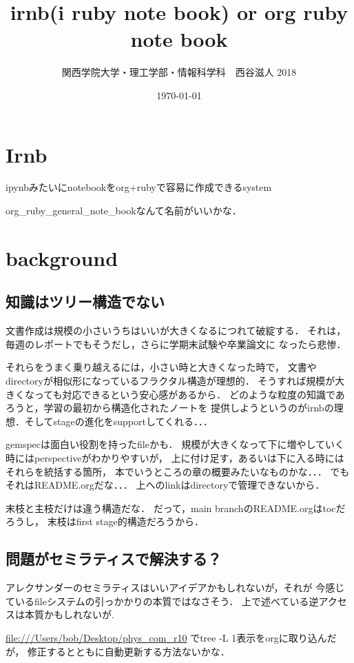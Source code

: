 \documentclass{jsarticle}
\author{関西学院大学・理工学部・情報科学科　西谷滋人 2018}
\date{\today}
\title{irnb(i ruby note book) or org ruby note book}
\begin{document}
\maketitle
\tableofcontents


\section{Irnb}
\label{sec-1}
ipynbみたいにnotebookをorg+rubyで容易に作成できるsystem

org\_ruby\_general\_note\_bookなんて名前がいいかな．

\section{background}
\label{sec-2}
\subsection{知識はツリー構造でない}
\label{sec-2-1}
文書作成は規模の小さいうちはいいが大きくなるにつれて破綻する．
それは，毎週のレポートでもそうだし，さらに学期末試験や卒業論文に
なったら悲惨．

それらをうまく乗り越えるには，小さい時と大きくなった時で，
文書やdirectoryが相似形になっているフラクタル構造が理想的．
そうすれば規模が大きくなっても対応できるという安心感があるから．
どのような粒度の知識であろうと，学習の最初から構造化されたノートを
提供しようというのがirnbの理想．そしてstageの進化をsupportしてくれる．．．

gemspecは面白い役割を持ったfileかも．
規模が大きくなって下に増やしていく時にはperspectiveがわかりやすいが，
上に付け足す，あるいは下に入る時にはそれらを統括する箇所，
本でいうところの章の概要みたいなものかな．．．
でもそれはREADME.orgだな．．．
上へのlinkはdirectoryで管理できないから．

末枝と主枝だけは違う構造だな．
だって，main branchのREADME.orgはtocだろうし，
末枝はfirst stage的構造だろうから．

\subsection{問題がセミラティスで解決する？}
\label{sec-2-2}
アレクサンダーのセミラティスはいいアイデアかもしれないが，それが
今感じているfileシステムの引っかかりの本質ではなさそう．
上で述べている逆アクセスは本質かもしれないが.

\url{file:///Users/bob/Desktop/phys_com_r10} でtree -L 1表示をorgに取り込んだが，
修正するとともに自動更新する方法ないかな．
\end{document}
